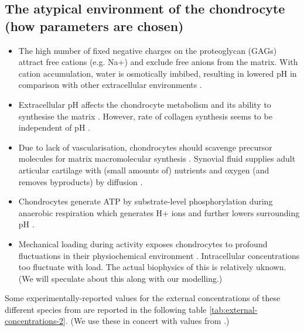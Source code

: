 \subsection*{The atypical environment of the chondrocyte (how
  parameters are chosen)}
\label{sec:chondrocyte-environment}


\begin{itemize}
  \item The high number of fixed negative charges on the proteoglycan
    (GAGs) attract free cations (e.g. Na+) and exclude free anions from
    the matrix. With cation accumulation, water is osmotically imbibed,
    resulting in lowered pH in comparison with other extracellular
    environments \citep{Wilkinsetal2000, LeeUrban1997}.
  \item Extracellular pH affects the chondrocyte metabolism and its
    ability to synthesise the matrix
    \citep{BarrettJolleyetal2010}. However, rate of collagen
    synthesis seems to be independent of pH \citep{Wuetal2007}.
  \item Due to lack of vascularisation, chondrocytes should scavenge
    precursor molecules for matrix macromolecular synthesis
    \citep{Holmetal1998, Stockwell1991}. Synovial fluid supplies adult
    articular cartilage with (small amounts of) nutrients and oxygen
    (and removes byproducts) by diffusion \citep{LeeUrban1997,
      Otte1991}.
  \item Chondrocytes generate ATP by substrate-level phosphorylation
    during anaerobic respiration which generates H+ ions and further
    lowers surrounding pH \citep{LeeUrban1997}.
  \item Mechanical loading during activity exposes chondrocytes to
    profound fluctuations in their physiochemical environment
    \citep{Mowetal1999, Urban1994}.
    Intracellular concentrations too fluctuate with load. The actual
    biophysics of this is relatively uknown. (We will speculate about
    this along with our modelling.)
\end{itemize}

Some experimentally-reported values for the external concentrations of
these different species from are reported in the following table
\ref{tab:external-concentrations-2}. (We use these in concert with
values from \cite{Clarketal2011}.)

